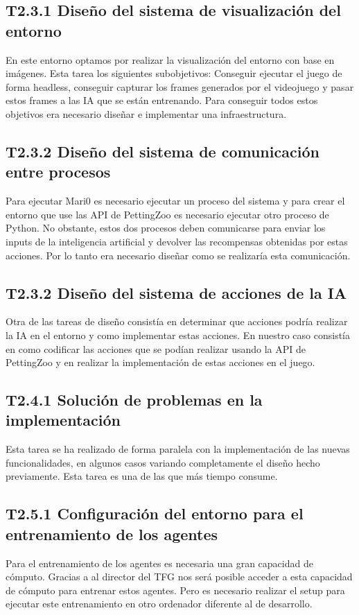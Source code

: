 \subsection*{T2.3.1 Diseño del sistema de visualización del entorno}
En este entorno optamos por realizar la visualización del entorno con base en imágenes. Esta tarea los siguientes subobjetivos: Conseguir ejecutar el juego de forma headless, conseguir capturar los frames generados por el videojuego y pasar estos frames a las IA que se están entrenando. Para conseguir todos estos objetivos era necesario diseñar e implementar una infraestructura.

\subsection*{T2.3.2 Diseño del sistema de comunicación entre procesos}
Para ejecutar Mari0 es necesario ejecutar un proceso del sistema y para crear el entorno que use las API de PettingZoo es necesario ejecutar otro proceso de Python. No obstante, estos dos procesos deben comunicarse para enviar los inputs de la inteligencia artificial y devolver las recompensas obtenidas por estas acciones. Por lo tanto era necesario diseñar como se realizaría esta comunicación.

\subsection*{T2.3.2 Diseño del sistema de acciones de la IA}
Otra de las tareas de diseño consistía en determinar que acciones podría realizar la IA en el entorno y como implementar estas acciones. En nuestro caso consistía en como codificar las acciones que se podían realizar usando la API de PettingZoo y en realizar la implementación de estas acciones en el juego.

\subsection*{T2.4.1 Solución de problemas en la implementación}
Esta tarea se ha realizado de forma paralela con la implementación de las nuevas funcionalidades, en algunos casos variando completamente el diseño hecho previamente. Esta tarea es una de las que más tiempo consume.

\subsection*{T2.5.1 Configuración del entorno para el entrenamiento de los agentes}
Para el entrenamiento de los agentes es necesaria una gran capacidad de cómputo. Gracias a al director del TFG nos será posible acceder a esta capacidad de cómputo para entrenar estos agentes. Pero es necesario realizar el setup para ejecutar este entrenamiento en otro ordenador diferente al de desarrollo.  

